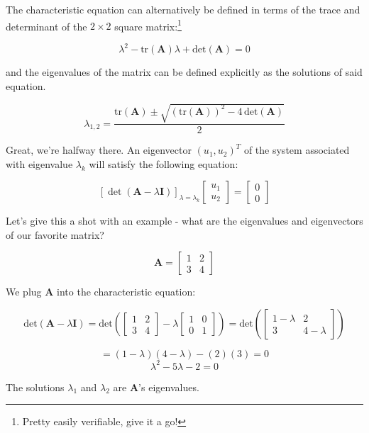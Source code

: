 \documentclass[
  letterpaper,
  DIV=11,
  numbers=noendperiod]{scrreprt}
\begin{document}
The characteristic equation can alternatively be defined in terms of the
trace and determinant of the \(2\times2\) square matrix:\footnote{Pretty
  easily verifiable, give it a go!}

\[\lambda^2 - \text{tr}(\textbf{A}) \lambda + \text{det}(\textbf{A}) = 0\]

and the eigenvalues of the matrix can be defined explicitly as the
solutions of said equation.

\[\lambda_{1, 2} = \frac{\text{tr}(\textbf{A}) \pm \sqrt{(\text{tr}(\textbf{A}))^2 - 4 \, \text{det}(\textbf{A})}}{2}\]

Great, we're halfway there. An eigenvector \((u_1, u_2)^T\) of the
system associated with eigenvalue \(\lambda_k\) will satisfy the
following equation:

\[\left[\det(\textbf{A} - \lambda \textbf{I}) \right]_{\lambda = \lambda_k} \begin{bmatrix}
    u_1 \\
    u_2\end{bmatrix} = \begin{bmatrix}
        0 \\
        0\end{bmatrix}\]

Let's give this a shot with an example - what are the eigenvalues and
eigenvectors of our favorite matrix?

\[\textbf{A} = \begin{bmatrix} 1 & 2 \\ 3 & 4 \end{bmatrix}\]

We plug \(\textbf{A}\) into the characteristic equation:

\[\text{det}\left(\textbf{A} - \lambda \textbf{I}\right) = \text{det}\left(\begin{bmatrix} 1 & 2 \\ 3 & 4 \end{bmatrix} - \lambda \begin{bmatrix} 1 & 0 \\ 0 & 1 \end{bmatrix}\right) = \text{det}\left(\begin{bmatrix} 1 - \lambda & 2 \\ 3 & 4 - \lambda \end{bmatrix} \right)\]

\[ = (1-\lambda)(4-\lambda)-(2)(3) = 0\] \[\lambda^2 - 5\lambda -2 = 0\]

The solutions \(\lambda_1\) and \(\lambda_2\) are \(\textbf{A}\)'s
eigenvalues.
\end{document}

